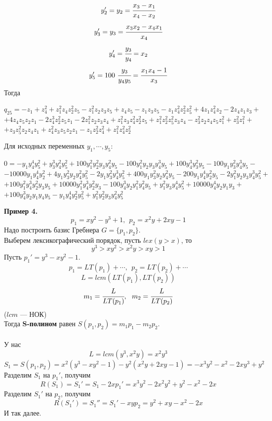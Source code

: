 \documentclass[12pt]{article}
\theoremstyle{definition}
\numberwithin{equation}{section}
\begin{document}
$$y_2'=y_2=\cfrac{x_3-x_1}{x_4-x_2}$$
$$y_3'=y_3=\cfrac{x_3x_2-x_4x_1}{x_4}$$
$$y_4'=\cfrac{y_3}{y_4}=x_2$$
$$y_5'=100~\cfrac{y_3}{y_4y_5}=\cfrac{x_1x_4-1}{x_3}$$
Тогда 
\begin{center}
$q_{25}=-z_1+z_4^2+z_1^2z_4z_2^2z_5-z_1^2z_2z_3z_5+z_4z_5-z_1z_3z_5-z_1z_4^2z_2^2z_5^2+4z_1z_4^2z_2-2z_4z_1z_3+$\\
$+4z_4z_5z_2z_1-2z_4^3z_2^2z_5z_1-2z_1^2z_2z_3z_4+z_1^2z_3z_4^2z_2^2z_5+z_1^2z_2^2z_5^2z_3z_4-z_3^2z_2z_4z_5z_1^2+z_3^2z_1^2+$\\
$+z_3z_5^2z_2z_4z_1+z_4^2z_3z_5z_2z_1-z_1z_2^2z_4^2+z_1^2z_4^2z_2^2$
\end{center}
Для исходных переменных $y_1, \cdots, y_5$:
\begin{center}
$0=-y_1y_4^4y_5^2+y_3^3y_4^2y_5^2+100y_1^2y_2^2y_3y_4^2y_5-100y_1^2y_2y_3y_4^3y_5+100y_4^3y_3^2y_5-100y_1y_3^2y_4^3y_5-$\\
$-10000y_1y_4^4y_2^2+4y_1y_3^2y_2y_4^2y_5^2-2y_1y_3^2y_4^3y_5^2+400y_1y_3^2y_2y_4^2y_5-200y_1y_4^4y_2^2y_5-2y_1^2y_2y_3y_4^3y_5^2+$\\
$+100y_1^2y_4^3y_2^2y_3y_5+10000y_1^2y_4^3y_2^2y_3-100y_4^3y_2y_1^2y_4^2y_5+y_1^2y_3y_4^4y_5^2+10000y_4^4y_2y_1y_3+$\\
$+100y_4^3y_2y_1y_4y_5-y_1y_4^4y_2^2y_5^2+y_1^2y_2^2y_3y_4^2y_5^2$
\end{center}
\textbf{Пример 4.}\\
$$p_1=xy^2-y^3+1,~~p_2=x^2y+2xy-1$$
Надо построить базис Гребнера $G=\{p_1, p_2\}$.\\
Выберем лексикографический порядок, пусть $lex(y>x)$, то
$$y^3>xy^2>x^2y>xy>1$$
Пусть $p_1'=y^3-xy^2-1$.\\
$$p_1=LT(p_1)+\cdots,~~p_2=LT(p_2)+\cdots$$
$$L=lcm(LT(p_1), LT(p_2))$$
$$m_1=\cfrac{L}{LT(p_1)},~~m_2=\cfrac{L}{LT(p_2)}$$
($lcm$ --- НОК)\\
Тогда \textbf{S-полином} равен $S(p_1, p_2)=m_1p_1-m_2p_2$.\\
\\
У нас $$L=lcm(y^3, x^2y)=x^2y^3$$
$$S_1=S(p_1, p_2)=x^2(y^3-xy^2-1)-y^2(x^2y+2xy-1)=-x^3y^2-x^2-2xy^3+y^2$$
Разделим $S_1$ на $p_1'$, получим $$R(S_1)=S_1'=S_1-2xp_1'=x^3y^2-2x^2y^2+y^2-x^2-2x$$
Разделим $S_1'$ на $p_2$, получим
$$R(S_1')=S_1''=S_1'-xyp_2=y^2+xy-x^2-2x$$
И так далее.\\
\\
\end{document}
